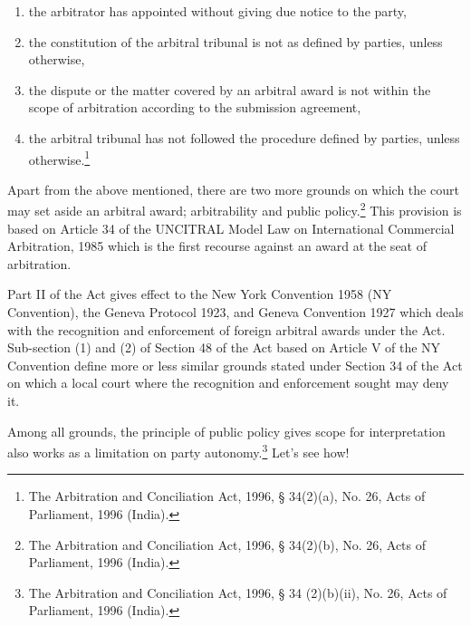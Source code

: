 \begin{multicols}{2}
\begin{enumerate}[label=$\alph*.$]
\item the arbitrator has appointed without giving due notice to the party,

\item the constitution of the arbitral tribunal is not as defined by parties, unless otherwise,

\item the dispute or the matter covered by an arbitral award is not within the scope of arbitration according to the submission agreement,

\item the arbitral tribunal has not followed the procedure defined by parties, unless otherwise.\footnote{The Arbitration and Conciliation Act, 1996, § 34(2)(a), No. 26, Acts of Parliament, 1996 (India).}
\end{enumerate}

\vspace{-.3cm}

\noi
Apart from the above mentioned, there are two more grounds on which the court may set aside an arbitral award; arbitrability and public policy.\footnote{The Arbitration and Conciliation Act, 1996, § 34(2)(b), No. 26, Acts of Parliament, 1996 (India).} This provision is based on Article 34 of the UNCITRAL Model Law on International Commercial Arbitration, 1985 which is the first recourse against an award at the seat of arbitration.

\vspace{-.1cm}
\noi
Part II of the Act gives effect to the New York Convention 1958 (NY Convention), the Geneva
Protocol 1923, and Geneva Convention 1927 which deals with the recognition and
enforcement of foreign arbitral awards under the Act. Sub-section (1) and (2) of Section 48 of
the Act based on Article V of the NY Convention define more or less similar grounds stated
under Section 34 of the Act on which a local court where the recognition and enforcement
sought may deny it.

\vspace{-.1cm}

\noi
Among all grounds, the principle of public policy gives scope for interpretation also works as a limitation on party autonomy.\footnote{The Arbitration and Conciliation Act, 1996, § 34 (2)(b)(ii), No. 26, Acts of Parliament, 1996 (India).} Let’s see how!

\vspace{-.1cm}



\end{multicols}
